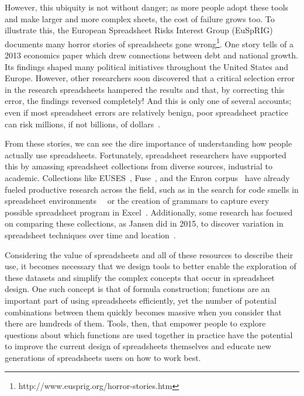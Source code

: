 \documentclass[conference]{IEEEtran}
\begin{document}
	However, this ubiquity is not without danger; as more people adopt these tools
	and make larger and more complex sheets, the cost of failure grows too. To
	illustrate this, the European Spreadsheet Risks Interest Group (EuSpRIG)
	documents many horror stories of spreadsheets gone
	wrong\footnote{http://www.eusprig.org/horror-stories.htm}. One story tells of a
	2013 economics paper which drew connections between debt and national growth.
	Its findings shaped many political initiatives throughout the United States and
	Europe. However, other researchers soon discovered that a critical selection
	error in the research spreadsheets hampered the results and that, by correcting
	this error, the findings reversed completely! And this is only one of several
	accounts; even if most spreadsheet errors are relatively benign, poor
	spreadsheet practice can risk millions, if not billions, of
	dollars~\cite{powell2009impact}.
	
	From these stories, we can see the dire importance of understanding how people
	actually use spreadsheets. Fortunately, spreadsheet researchers have supported
	this by amassing spreadsheet collections from diverse sources, industrial to
	academic. Collections like EUSES~\cite{fisher2005euses},
	Fuse~\cite{barik2015fuse}, and the Enron corpus~\cite{hermans2015enron} have
	already fueled productive research across the field, such as in the search for
	code smells in spreadsheet
	environments~\cite{hermans2012detecting}~\cite{jansen2015code} or the creation
	of grammars to capture every possible spreadsheet program in
	Excel~\cite{aivaloglou2015grammar}. Additionally, some research has focused on
	comparing these collections, as Jansen did in 2015, to discover variation in
	spreadsheet techniques over time and location~\cite{jansen2015enron}.
	
	Considering the value of spreadsheets and all of these resources to describe
	their use, it becomes necessary that we design tools to better enable the
	exploration of these datasets and simplify the complex concepts that occur in
	spreadsheet design. One such concept is that of formula construction; functions
	are an important part of using spreadsheets efficiently, yet the number of
	potential combinations between them quickly becomes massive when you consider
	that there are hundreds of them. Tools, then, that empower people to explore
	questions about which functions are used together in practice have the
	potential to improve the current design of spreadsheets themselves and educate
	new generations of spreadsheets users on how to work best.
	
\end{document}
